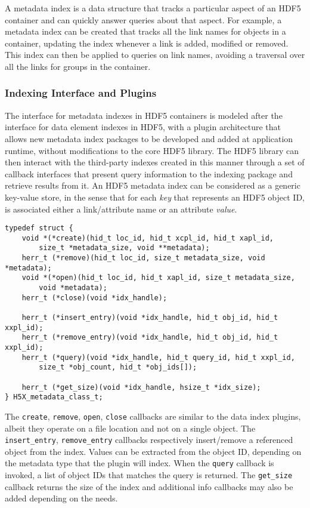 A metadata index is a data structure that tracks a particular aspect of an HDF5 container 
and can quickly answer queries about that aspect. For example, a metadata index can 
be created that tracks all the link names for objects in a container, updating the index 
whenever a link is added, modified or removed. This index can then be applied to 
queries on link names, avoiding a traversal over all the links for groups in the container.

\subsubsection{Indexing Interface and Plugins}

The interface for metadata indexes in HDF5 containers is modeled after the interface 
for data element indexes in HDF5, with a plugin architecture that allows new metadata 
index packages to be developed and added at application runtime, without modifications 
to the core HDF5 library.
The HDF5 library can then interact with the third-party indexes created in this manner 
through a set of callback interfaces that present query information to the
indexing package and retrieve results from it.
An HDF5 metadata index can be considered as a generic key-value store, in the
sense that for each \textit{key} that represents an HDF5 object ID, is associated
either a link/attribute name or an attribute \textit{value}.

{
\begin{lstlisting}
typedef struct {
    void *(*create)(hid_t loc_id, hid_t xcpl_id, hid_t xapl_id,
        size_t *metadata_size, void **metadata);
    herr_t (*remove)(hid_t loc_id, size_t metadata_size, void *metadata);
    void *(*open)(hid_t loc_id, hid_t xapl_id, size_t metadata_size,
        void *metadata);
    herr_t (*close)(void *idx_handle);

    herr_t (*insert_entry)(void *idx_handle, hid_t obj_id, hid_t xxpl_id);
    herr_t (*remove_entry)(void *idx_handle, hid_t obj_id, hid_t xxpl_id);
    herr_t (*query)(void *idx_handle, hid_t query_id, hid_t xxpl_id,
        size_t *obj_count, hid_t *obj_ids[]);

    herr_t (*get_size)(void *idx_handle, hsize_t *idx_size);
} H5X_metadata_class_t;
\end{lstlisting}
}

The \texttt{create}, \texttt{remove}, \texttt{open}, \texttt{close} callbacks
are similar to the data index plugins, albeit they operate on a file location and
not on a single object. The \texttt{insert\_entry}, \texttt{remove\_entry} callbacks
respectively insert/remove a referenced object from the index. Values can be extracted from
the object ID, depending on the metadata type that the plugin will index.
When the \texttt{query} callback is invoked, a list of object IDs that matches
the query is returned. The \texttt{get\_size} callback returns the size of the index
and additional info callbacks may also be added depending on the needs.

